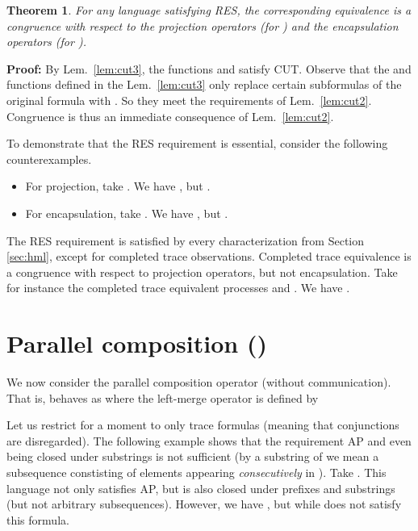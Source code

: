\documentclass{eptcs}
\newtheorem{theo}{Theorem}
\newenvironment{theorem}{\begin{theo} \rm }{\end{theo}}
\newenvironment{proof}{\begin{trivlist} \item[\hspace{\labelsep}\bf Proof:]}{\hfill  \end{trivlist}}
\begin{document}
\begin{theorem}
For any language  satisfying RES, the corresponding equivalence  is a congruence with respect to the projection operators  (for ) and the encapsulation operators  (for ).
\end{theorem}

\begin{proof}
By Lem.\ \ref{lem:cut3}, the functions  and  satisfy CUT.
Observe that the  and  functions defined in the Lem.~\ref{lem:cut3} only replace certain subformulas  of the original formula with . So they meet the requirements of Lem.~\ref{lem:cut2}. Congruence is thus an immediate consequence of Lem.\ \ref{lem:cut2}.
\end{proof}

To demonstrate that the RES requirement is essential, consider the following counterexamples.
\begin{itemize}
\item
For projection, take . We have , but .
\item
 For encapsulation, take . We have , but .
\end{itemize}

The RES requirement is satisfied by every characterization from Section \ref{sec:hml}, except for completed trace observations. Completed trace equivalence is a congruence with respect to projection operators, but not encapsulation. Take for instance the completed trace equivalent processes  and . We have .



\section{Parallel composition ()}

We now consider the parallel composition operator (without communication). That is,  behaves as  where the left-merge operator is defined by
\begin{center}

\end{center}

Let us restrict for a moment to only trace formulas (meaning that conjunctions are disregarded). The following example shows that the requirement AP and even being closed under substrings is not sufficient (by a substring of  we mean a subsequence constisting of elements appearing \textit{consecutively} in ). 
Take . This language not only satisfies AP, but is also closed under prefixes and substrings (but not arbitrary subsequences). However, we have , but  while  does not satisfy this formula.
\end{document}
